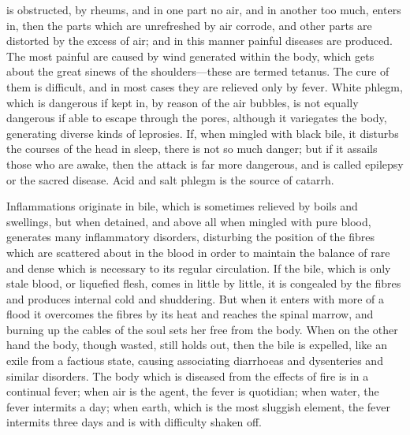 is obstructed, by rheums, and in one part no air, and in another too much,
enters in, then the parts which are unrefreshed by air corrode, and other
parts are distorted by the excess of air; and in this manner painful
diseases are produced. The most painful are caused by wind generated
within the body, which gets about the great sinews of the shoulders—these
are termed tetanus. The cure of them is difficult, and in most cases they
are relieved only by fever. White phlegm, which is dangerous if kept in,
by reason of the air bubbles, is not equally dangerous if able to escape
through the pores, although it variegates the body, generating diverse
kinds of leprosies. If, when mingled with black bile, it disturbs the
courses of the head in sleep, there is not so much danger; but if it
assails those who are awake, then the attack is far more dangerous, and is
called epilepsy or the sacred disease. Acid and salt phlegm is the source
of catarrh.

Inflammations originate in bile, which is sometimes relieved by boils and
swellings, but when detained, and above all when mingled with pure blood,
generates many inflammatory disorders, disturbing the position of the
fibres which are scattered about in the blood in order to maintain the
balance of rare and dense which is necessary to its regular circulation.
If the bile, which is only stale blood, or liquefied flesh, comes in
little by little, it is congealed by the fibres and produces internal cold
and shuddering. But when it enters with more of a flood it overcomes the
fibres by its heat and reaches the spinal marrow, and burning up the
cables of the soul sets her free from the body. When on the other hand the
body, though wasted, still holds out, then the bile is expelled, like an
exile from a factious state, causing associating diarrhoeas and
dysenteries and similar disorders. The body which is diseased from the
effects of fire is in a continual fever; when air is the agent, the fever
is quotidian; when water, the fever intermits a day; when earth, which is
the most sluggish element, the fever intermits three days and is with
difficulty shaken off.

